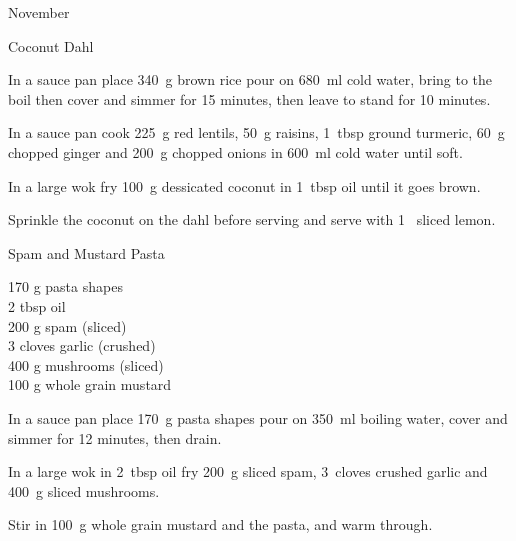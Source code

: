\begin{menu}{November}
\begin{recipe}{2}{Coconut Dahl}
    \begin{instructions}
    \item 
    In a
    sauce pan
    place
    340~g  brown rice
    pour on
    680~ml  cold water,
    bring to the boil then cover and simmer for 15 minutes,
    then leave to stand for 10 minutes.
  \item 
        In a sauce pan cook
        225~g  red lentils,
        50~g  raisins,
        1~tbsp  ground turmeric,
        60~g chopped ginger
        and
        200~g chopped onions
        in
        600~ml  cold water
        until soft.
      \item 
        In a large wok fry
        100~g  dessicated coconut
        in
        1~tbsp  oil
        until it goes brown.
      \item 
        Sprinkle the coconut on the dahl
        before serving
        and
        serve with
        1~ sliced lemon.
      
    \end{instructions}
    \end{recipe}%
  
    \begin{recipe}{1}{Spam and Mustard Pasta}%
		\begin{ingredients}
		170 g pasta shapes  \\
	2 tbsp oil  \\
	200 g spam (sliced) \\
	3 cloves garlic (crushed) \\
	400 g mushrooms (sliced) \\
	100 g whole grain mustard  \\
	
		\end{ingredients}
	
	
    \begin{instructions}
    \item 
    In a
    sauce pan
    place
    170~g  pasta shapes
    pour on
    350~ml  boiling water,
    cover and simmer for 12 minutes, then drain.
  \item 
        In a large wok in
        2~tbsp  oil
        fry
        200~g sliced spam,
        3~cloves crushed garlic
        and
        400~g sliced mushrooms.
      \item 
        Stir in
        100~g  whole grain mustard
        and the pasta,
        and warm through.
      
    \end{instructions}
    \end{recipe}%
  
    \clearpage
    \end{menu}
	
